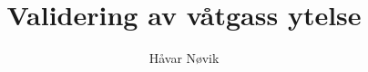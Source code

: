 \usepackage[norsk]{babel}

\usepackage[utf8x]{inputenc}

\usepackage{graphicx}

\usepackage{nomencl}
\makenomenclature
\renewcommand{\nomname}{Nomenklaturliste}

\newcommand{\titleinfo}{Validering av våtgass ytelse}
\newcommand{\authorinfo}{Håvar Nøvik}
\title{\titleinfo}
\author{\authorinfo}